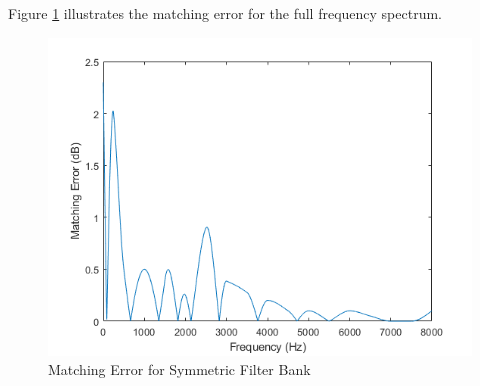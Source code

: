 \documentclass[12pt, onecolumn]{article}
\begin{document}
\begin{appendices}
\noindent Figure \ref{fig:ansiOctMatErr} illustrates the matching error for the full frequency spectrum.

\begin{figure}[h]
\centering
\includegraphics[width=0.6\linewidth]{ansiOctMatErr.PNG}
\caption{Matching Error for Symmetric Filter Bank}
\label{fig:ansiOctMatErr}
\end{figure} 


\end{appendices}
\end{document}
